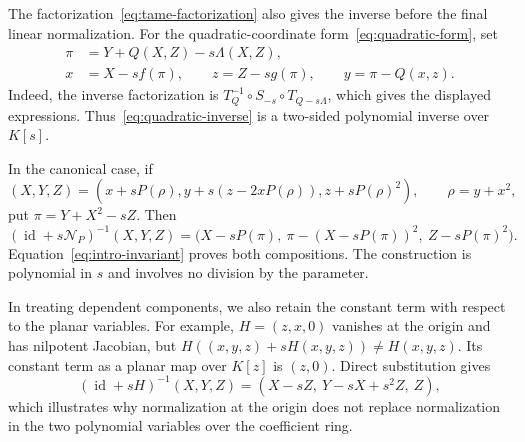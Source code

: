 \documentclass[11pt,reqno]{amsart}
\theoremstyle{definition}
\theoremstyle{remark}
\numberwithin{equation}{section}
\DeclareMathOperator{\id}{id}
\newcommand{\Ncal}{\mathcal N}
\begin{document}
The factorization~\eqref{eq:tame-factorization} also gives the inverse before the final linear normalization. For the quadratic-coordinate form~\eqref{eq:quadratic-form}, set
\begin{equation}\label{eq:quadratic-inverse}
 \begin{aligned}
 \pi&=Y+Q(X,Z)-s\Lambda(X,Z),\\
 x&=X-sf(\pi),\qquad z=Z-sg(\pi),\qquad y=\pi-Q(x,z).
 \end{aligned}
\end{equation}
Indeed, the inverse factorization is $T_Q^{-1}\circ S_{-s}\circ T_{Q-s\Lambda}$, which gives the displayed expressions. Thus~\eqref{eq:quadratic-inverse} is a two-sided polynomial inverse over $K[s]$.

In the canonical case, if
\[
 (X,Y,Z)=(x+sP(\rho),y+s(z-2xP(\rho)),z+sP(\rho)^2),\qquad \rho=y+x^2,
\]
put $\pi=Y+X^2-sZ$. Then
\begin{equation}\label{eq:canonical-inverse}
 (\id+s\Ncal_P)^{-1}(X,Y,Z)
 =\bigl(X-sP(\pi),\ \pi-(X-sP(\pi))^2,\ Z-sP(\pi)^2\bigr).
\end{equation}
Equation~\eqref{eq:intro-invariant} proves both compositions. The construction is polynomial in $s$ and involves no division by the parameter.

In treating dependent components, we also retain the constant term with respect to the planar variables. For example, $H=(z,x,0)$ vanishes at the origin and has nilpotent Jacobian, but $H((x,y,z)+sH(x,y,z))\neq H(x,y,z)$. Its constant term as a planar map over $K[z]$ is $(z,0)$. Direct substitution gives
\[
 (\id+sH)^{-1}(X,Y,Z)=(X-sZ,\ Y-sX+s^2Z,\ Z),
\]
which illustrates why normalization at the origin does not replace normalization in the two polynomial variables over the coefficient ring.

\end{document}
